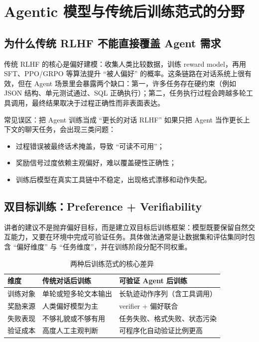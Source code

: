 \section{Agentic 模型与传统后训练范式的分野}

\subsection{为什么传统 RLHF 不能直接覆盖 Agent 需求}
传统 RLHF 的核心是偏好建模：收集人类比较数据，训练 reward model，再用 SFT、PPO/GRPO 等算法提升 ``被人偏好'' 的概率。这条链路在对话系统上很有效，但在 Agent 场景里会暴露两个缺口：第一，许多任务存在硬约束（例如 JSON 结构、单元测试通过、SQL 正确执行）；第二，任务执行过程会跨越多轮工具调用，最终结果取决于过程正确性而非表面表达。

\begin{warningbox}{常见误区：把 Agent 训练当成 ``更长的对话 RLHF''}
如果只把 Agent 当作更长上下文的聊天任务，会出现三类问题：
\begin{itemize}
    \item 过程错误被最终话术掩盖，导致 ``可读不可用''；
    \item 奖励信号过度依赖主观偏好，难以覆盖硬性正确性；
    \item 训练后模型在真实工具链中不稳定，出现格式漂移和动作失配。
\end{itemize}
\end{warningbox}

\subsection{双目标训练：Preference + Verifiability}
讲者的建议不是抛弃偏好目标，而是建立双目标后训练框架：模型既要保留自然交互能力，又要在环境中完成可验证任务。具体做法通常是让数据集和评估集同时包含 ``偏好维度'' 与 ``任务维度''，并在训练阶段分配不同权重。

\begin{table}[H]
\centering
\begin{tabular}{p{2.8cm}p{4.1cm}p{4.6cm}}
\toprule
\textbf{维度} & \textbf{传统对话后训练} & \textbf{可验证 Agent 后训练} \\
\midrule
训练对象 & 单轮或短多轮文本输出 & 长轨迹动作序列（含工具调用） \\
奖励来源 & 人类偏好模型为主 & verifier + 偏好联合 \\
失败表现 & 不够礼貌或不够有用 & 任务失败、格式失败、状态污染 \\
验证成本 & 高度人工主观判断 & 可程序化自动验证比例更高 \\
\bottomrule
\end{tabular}
\caption{两种后训练范式的核心差异}
\end{table}

